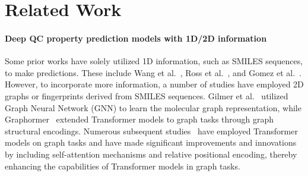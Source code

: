 \documentclass{article}
\begin{document}
\section{Related Work}
\vspace{-6pt}
\paragraph{Deep QC property prediction models with 1D/2D information}
Some prior works have solely utilized 1D information, such as SMILES sequences, to make predictions. These include Wang et al.~\cite{wang2019smiles}, Ross et al.~\cite{ross2022large}, and Gomez et al.~\cite{gomez2018automatic}. However, to incorporate more information, a number of studies have employed 2D graphs or fingerprints derived from SMILES sequences. Gilmer et al.~\cite{gilmer2017neural} utilized Graph Neural Network (GNN) to learn the molecular graph representation, while Graphormer~\cite{ying2021transformers} extended Transformer models to graph tasks through graph structural encodings. Numerous subsequent studies~\cite{gilmer2017neural, luo2022your, kim2022pure, park2022grpe, hussain2022global} have employed Transformer models on graph tasks and have made significant improvements and innovations by including self-attention mechanisms and relative positional encoding, thereby enhancing the capabilities of Transformer models in graph tasks. 

\vspace{-6pt}
\end{document}
